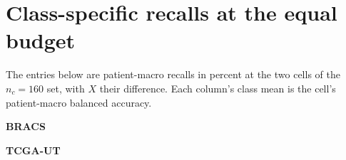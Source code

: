 \documentclass[11pt]{article}
\begin{document}
\section{Class-specific recalls at the equal budget}
The entries below are patient-macro recalls in percent at the two cells of the $n_c=160$ set, with $X$ their difference. Each column's class mean is the cell's patient-macro balanced accuracy.

\begin{table}[!htbp]
\centering\footnotesize
\setlength{\tabcolsep}{4pt}
\textbf{BRACS}\par\smallskip

\par\medskip
\textbf{TCGA-UT}\par\smallskip

\caption{Class-specific patient-macro recall at the broad allocation $(20, 8)$ and the deep allocation $(5, 32)$, with paired 95\% intervals. Positive $X$ favours breadth.}
\label{tab:class-recalls}
\end{table}
\clearpage



\end{document}
